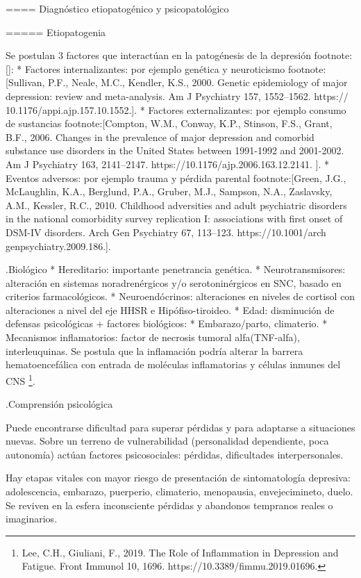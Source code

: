 ==== Diagnóstico etiopatogénico y psicopatológico

===== Etiopatogenia

Se postulan 3 factores que interactúan en la patogénesis de la depresión footnote:[]:
* Factores internalizantes: por ejemplo genética y neuroticismo footnote:[Sullivan, P.F., Neale, M.C., Kendler, K.S., 2000. Genetic epidemiology of major
depression: review and meta-analysis. Am J Psychiatry 157, 1552–1562. https://
10.1176/appi.ajp.157.10.1552.].
* Factores externalizantes: por ejemplo consumo de sustancias footnote:[Compton, W.M., Conway, K.P., Stinson, F.S., Grant, B.F., 2006. Changes in the
prevalence of major depression and comorbid substance use disorders in the United
States between 1991-1992 and 2001-2002. Am J Psychiatry 163, 2141–2147.
https://10.1176/ajp.2006.163.12.2141. ].
* Eventos adversos: por ejemplo trauma y pérdida parental footnote:[Green, J.G., McLaughlin, K.A., Berglund, P.A., Gruber, M.J., Sampson, N.A.,
Zaslavsky, A.M., Kessler, R.C., 2010. Childhood adversities and adult psychiatric
disorders in the national comorbidity survey replication I: associations with first
onset of DSM-IV disorders. Arch Gen Psychiatry 67, 113–123. https://10.1001/arch
genpsychiatry.2009.186.].

.Biológico
* Hereditario: importante penetrancia genética.
* Neurotransmisores: alteración en sistemas noradrenérgicos y/o serotoninérgicos en SNC, basado en criterios farmacológicos.
* Neuroendócrinos: alteraciones en niveles de cortisol con alteraciones a nivel del eje HHSR e Hipófiso-tiroideo.
* Edad: disminución de defensas psicológicas + factores biológicos:
* Embarazo/parto, climaterio.
* Mecanismos inflamatorios: factor de necrosis tumoral alfa(TNF-alfa), interleuquinas. Se postula que la inflamación podría alterar la barrera hematoencefálica con entrada de moléculas inflamatorias y células inmunes del CNS \footnote{Lee, C.H., Giuliani, F., 2019. The Role of Inflammation in Depression and Fatigue. Front
Immunol 10, 1696. https://10.3389/fimmu.2019.01696.}.

.Comprensión psicológica

Puede encontrarse dificultad para superar pérdidas y para adaptarse a situaciones nuevas. Sobre un terreno de vulnerabilidad (personalidad dependiente, poca autonomía) actúan factores psicosociales: pérdidas, dificultades interpersonales.

Hay etapas vitales con mayor riesgo de presentación de sintomatología depresiva: adolescencia, embarazo, puerperio, climaterio, menopausia, envejecimineto, duelo. Se reviven en la esfera inconsciente pérdidas y abandonos tempranos reales o imaginarios.

